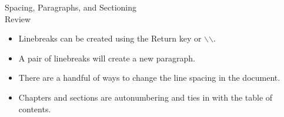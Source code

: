 \documentclass[pdf]{prosper}
\begin{document}
\begin{slide}{Spacing, Paragraphs, and Sectioning \\ Review}
	\begin{itemize}
		\item Linebreaks can be created using the Return key or $\backslash$$\backslash$.
		\item A pair of linebreaks will create a new paragraph.
		\item There are a handful of ways to change the line spacing in the document.
		\item Chapters and sections are autonumbering and ties in with the table of contents.
	\end{itemize}
\end{slide}
\end{document}
